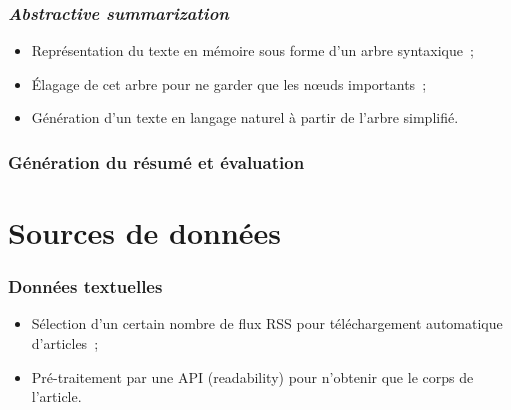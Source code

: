 \documentclass[12pt, handout]{beamer}
\begin{document}
\begin{frame}
 \frametitle{\textit{Abstractive summarization}}
 \begin{itemize}
  \item Représentation du texte en mémoire sous forme d'un arbre syntaxique~;
  \item Élagage de cet arbre pour ne garder que les nœuds importants~;
  \item Génération d'un texte en langage naturel à partir de l'arbre simplifié.
 \end{itemize}
\end{frame}


\begin{frame}
 \frametitle{Génération du résumé et évaluation}
 
\end{frame}

\section{Sources de données}


\begin{frame}
 \frametitle{Données textuelles}
 \begin{itemize}
  \item Sélection d'un certain nombre de flux RSS pour téléchargement automatique d'articles~;
  \item Pré-traitement par une API (readability) pour n'obtenir que le corps de l'article.
 \end{itemize}
 
 
\end{frame}

\end{document}
